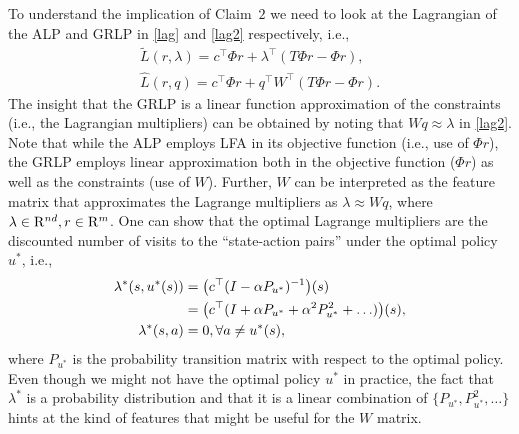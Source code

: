 \documentclass[12pt,draftcls,onecolumn]{IEEEtran}
\begin{document}
To understand the implication of Claim~$2$ we need to look at the Lagrangian of the ALP and GRLP in \eqref{lag} and \eqref{lag2} respectively, i.e., 
\begin{align}\label{lag}
\tilde{L}(r,\lambda)=c^\top \Phi r+\lambda^\top (T\Phi r-\Phi r), \\ \label{lag2}\hat{L}(r,q)=c^\top \Phi r+q^\top W^\top (T\Phi r-\Phi r).
\end{align}
The insight that the GRLP is a linear function approximation of the constraints (i.e., the Lagrangian multipliers) can be obtained by noting that $ Wq\approx \lambda$ in \eqref{lag2}. Note that while the ALP employs LFA in its objective function (i.e., use of $\Phi r$), the GRLP employs linear approximation both in the objective function ($\Phi r$) as well as the constraints (use of $W$). Further, $W$ can be interpreted as the feature matrix that approximates the Lagrange multipliers as $\lambda\approx Wq$, where $\lambda \in \mathrm{R}^{nd}, r\in \mathrm{R}^m$. One can show \cite{dolgov} that the optimal Lagrange multipliers are the discounted number of visits to the ``state-action pairs'' under the optimal policy $u^*$, i.e., 
\begin{align}
\lambda^*(s,u^*(s))&=\big(c^\top(I-\alpha P_{u^*})^{-1}\big)(s)\nonumber\\
				&= \big(c^\top(I+\alpha P_{u^*}+\alpha^2 P_{u^*}^2+\ldots)\big)(s),\nonumber\\
			\lambda^*(s,a)&=0, \forall a \neq u^*(s),\nonumber
\end{align}
where $P_{u^*}$ is the probability transition matrix with respect to the optimal policy. Even though we might not have the optimal policy $u^*$ in practice, the fact that $\lambda^*$ is a probability distribution and that it is a linear combination of $\{P_{u^*},P^2_{u^*},\ldots\}$ hints at the kind of features that might be useful for the $W$ matrix.\\
\end{document}
